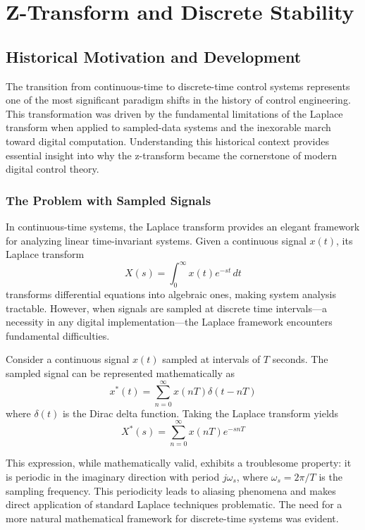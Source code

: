 
\setcounter{chapter}{19}

\chapter{Z-Transform and Discrete Stability}

\section{Historical Motivation and Development}

The transition from continuous-time to discrete-time control systems represents one of the most significant paradigm shifts in the history of control engineering. This transformation was driven by the fundamental limitations of the Laplace transform when applied to sampled-data systems and the inexorable march toward digital computation. Understanding this historical context provides essential insight into why the z-transform became the cornerstone of modern digital control theory.

\subsection{The Problem with Sampled Signals}

In continuous-time systems, the Laplace transform provides an elegant framework for analyzing linear time-invariant systems. Given a continuous signal $x(t)$, its Laplace transform
\begin{equation}
X(s) = \int_0^{\infty} x(t) e^{-st} \, dt
\end{equation}
transforms differential equations into algebraic ones, making system analysis tractable. However, when signals are sampled at discrete time intervals---a necessity in any digital implementation---the Laplace framework encounters fundamental difficulties.

Consider a continuous signal $x(t)$ sampled at intervals of $T$ seconds. The sampled signal can be represented mathematically as
\begin{equation}
x^*(t) = \sum_{n=0}^{\infty} x(nT) \delta(t - nT)
\end{equation}
where $\delta(t)$ is the Dirac delta function. Taking the Laplace transform yields
\begin{equation}
X^*(s) = \sum_{n=0}^{\infty} x(nT) e^{-snT}
\end{equation}

This expression, while mathematically valid, exhibits a troublesome property: it is periodic in the imaginary direction with period $j\omega_s$, where $\omega_s = 2\pi/T$ is the sampling frequency. This periodicity leads to aliasing phenomena and makes direct application of standard Laplace techniques problematic. The need for a more natural mathematical framework for discrete-time systems was evident.


